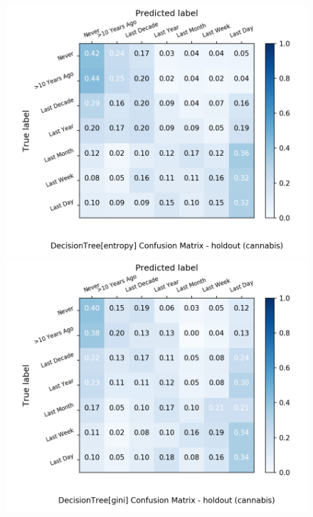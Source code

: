 \begin{figure}[H]
	\centering
	\begin{minipage}[b]{0.32\textwidth}
		\includegraphics[width=1.1\textwidth]{Plots/cannabis_DecisionTree_entropy_balance_False_holdout.png}
	\end{minipage}
	\begin{minipage}[b]{0.32\textwidth}
		\includegraphics[width=1.1\textwidth]{Plots/cannabis_DecisionTree_gini_balance_False_holdout.png}
	\end{minipage}
	\begin{minipage}[b]{0.32\textwidth}

\end{minipage}
\end{figure}
